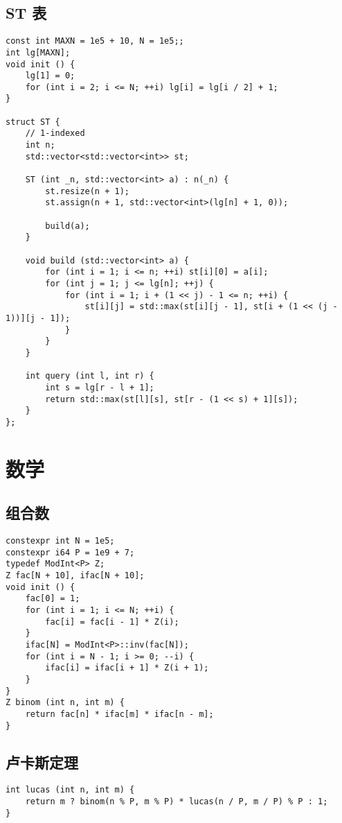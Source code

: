 \documentclass{ctexart}
\begin{document}
\subsection{ST 表}
\begin{verbatim}
const int MAXN = 1e5 + 10, N = 1e5;;
int lg[MAXN];
void init () {
    lg[1] = 0;
    for (int i = 2; i <= N; ++i) lg[i] = lg[i / 2] + 1;
}

struct ST {
    // 1-indexed
    int n;
    std::vector<std::vector<int>> st;
    
    ST (int _n, std::vector<int> a) : n(_n) {
        st.resize(n + 1);
        st.assign(n + 1, std::vector<int>(lg[n] + 1, 0));

        build(a);
    }

    void build (std::vector<int> a) {
        for (int i = 1; i <= n; ++i) st[i][0] = a[i];
        for (int j = 1; j <= lg[n]; ++j) {
            for (int i = 1; i + (1 << j) - 1 <= n; ++i) {
                st[i][j] = std::max(st[i][j - 1], st[i + (1 << (j - 1))][j - 1]);
            }
        }
    }

    int query (int l, int r) {
        int s = lg[r - l + 1];
        return std::max(st[l][s], st[r - (1 << s) + 1][s]);
    }
};
\end{verbatim}

\section{数学}
\subsection{组合数}
\begin{verbatim}
constexpr int N = 1e5;
constexpr i64 P = 1e9 + 7;
typedef ModInt<P> Z;
Z fac[N + 10], ifac[N + 10];
void init () {
    fac[0] = 1;
    for (int i = 1; i <= N; ++i) {
        fac[i] = fac[i - 1] * Z(i);
    }
    ifac[N] = ModInt<P>::inv(fac[N]);
    for (int i = N - 1; i >= 0; --i) {
        ifac[i] = ifac[i + 1] * Z(i + 1);
    }
}
Z binom (int n, int m) {
    return fac[n] * ifac[m] * ifac[n - m];
}
\end{verbatim}

\subsection{卢卡斯定理}
\begin{verbatim}
int lucas (int n, int m) {
    return m ? binom(n % P, m % P) * lucas(n / P, m / P) % P : 1;
}
\end{verbatim}
\end{document}
